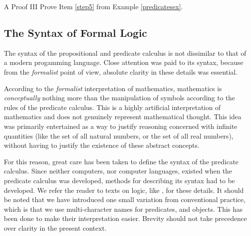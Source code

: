 \begin{exercise}{A Proof III}\label{step5ex}
Prove Item \ref{step5} from Example \ref{predicatesex}.
\end{exercise}

\subsection{The Syntax of Formal Logic}

The syntax of the propositional and predicate calculus is not dissimilar to that of a modern
progamming language. Close attention was paid to its syntax, because from the {\em formalist}
point of view, absolute clarity in these details was essential. 


According to the {\em formalist} interpretation of mathematics, mathematics
is {\em conceptually} nothing more than the manipulation of symbols according to the rules of
the predicate calculus. This is a highly artificial interpretation of mathematics and does
not genuinely represent mathematical thought. This idea was primarily entertained as a way
to justify reasoning concerned with infinite quantities (like the set of all natural numbers,
or the set of all real numbers), without having to justify the existence of these abstract
concepts.

For this reason, great care has been taken to define the syntax of the
predicate calculus.  Since neither computers, nor computer languages,
existed when the predicate calculus was developed, methods for describing
its syntax had to be developed.  We refer the reader to texts on logic,
like \cite{Kleene52}, \cite{Mendelson64} for these details.  It should
be noted that we have introduced one small variation from conventional
practice, which is that we use multi-character names for predicates, and
objects. This has been done to make their interpretation easier. Brevity
should not take precedence over clarity in the present context.

